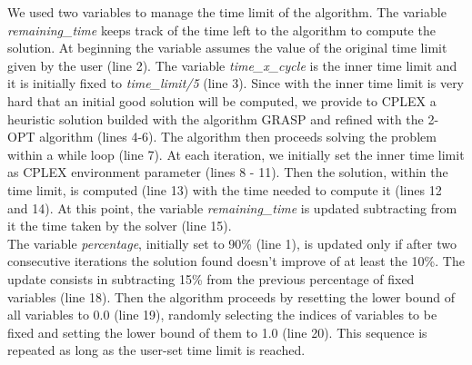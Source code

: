 We used two variables to manage the time limit of the algorithm. The variable \textit{remaining\_time} keeps track of the time left to the algorithm to compute the solution. At beginning the variable assumes the value of the original time limit given by the user (line 2). The variable \textit{time\_x\_cycle} is the inner time limit and it is initially fixed to \textit{time\_limit/5} (line 3). Since with the inner time limit is very hard that an initial good solution will be computed, we provide to CPLEX a heuristic solution builded with the algorithm GRASP and refined with the 2-OPT algorithm (lines 4-6).
The algorithm then proceeds solving the problem within a while loop (line 7). At each iteration, we initially set the inner time limit as CPLEX environment parameter (lines 8 - 11). 
Then the solution, within the time limit, is computed (line 13) with the time needed to compute it (lines 12 and 14).
At this point, the variable \textit{remaining\_time} is updated subtracting from it the time taken by the solver (line 15).
\\ The variable \textit{percentage}, initially set to 90\% (line 1), is updated only if after two consecutive iterations the solution found doesn't improve of at least the 10\%. The update consists in subtracting 15\% from the previous percentage of fixed variables (line 18). Then the algorithm proceeds by resetting the lower bound of all variables to 0.0 (line 19), randomly selecting the indices of variables to be fixed and setting the lower bound of them to 1.0 (line 20). This sequence is repeated as long as the user-set time limit is reached.

